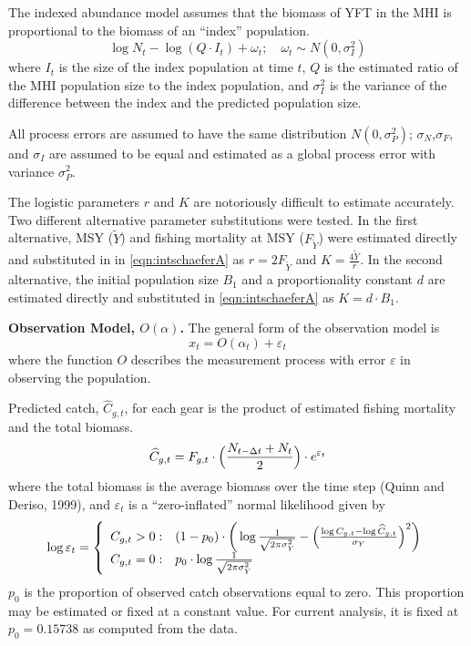 \documentclass[12pt,letterpaper,twoside]{article}
\newcommand\MSY{\tilde{Y}}
\newcommand\Fmsy{F_{\MSY}}
\begin{document}
The indexed abundance model
assumes that the biomass of YFT in the MHI
is proportional to the biomass of an ``index'' population.
\begin{equation}
\log N_t - \log (Q\cdot I_t) + \omega_t;\quad \omega_t\sim N(0,\sigma^2_I)
\label{eqn:index}
\end{equation}
where
$I_t$ is the size of the index population at time $t$,
$Q$ is the estimated ratio of the MHI population size to the index
population,
and $\sigma^2_I$ is the variance of the difference between the
index and the predicted population size.

All process errors are assumed to have the same distribution
$N(0,\sigma^2_P)$; $\sigma_N$,$\sigma_F$, and $\sigma_I$ are assumed
to be equal and estimated as a global process error with variance
$\sigma^2_P$.

The logistic parameters $r$ and $K$ are notoriously difficult to estimate
accurately. Two different
alternative parameter substitutions were tested. In the first
alternative, MSY ($\MSY$) and fishing mortality at MSY ($\Fmsy$) were
estimated directly and substituted in in \ref{eqn:intschaeferA} as
$r=2F_{\MSY}$ and $K=\frac{4\MSY}{r}$.
In the second alternative, the initial population size $B_1$ and a
proportionality constant $d$ are estimated directly and substituted in
\ref{eqn:intschaeferA} as $K=d\cdot B_1$.


{\bf Observation Model, $O(\alpha)$.}
The general form of the observation model is
\begin{equation}
x_t = O(\alpha_t) + \varepsilon_t
\end{equation}
where the function $O$ describes the measurement process with
error $\varepsilon$ in observing the population.

Predicted catch, $\widehat{C}_{g,t}$, for each gear is the product of
estimated fishing mortality and the total biomass.
\begin{equation}
\widehat{C}_{g,t} = F_{g,t}\cdot\Bigl(\frac{N_{t-\Delta
t}+N_t}{2}\Bigr) \cdot e^{\varepsilon_t}
\label{eqn:obs1}
\end{equation}
where the total biomass is  the average
biomass over the time step (Quinn and Deriso, 1999), and
$\varepsilon_t$ is a ``zero-inflated'' normal likelihood given by
\begin{equation}
  \log \varepsilon_t = \left\{
    \begin{array}{r@{\;:\quad}l}
       C_{g,t} > 0 &
(1-p_0)\cdot\bigg(\log\frac{1}{\sqrt{2\pi\sigma^2_Y}}
          -\Bigl(\frac{\log
C_{g,t}-\log\widehat{C}_{g,t}}{\sigma_Y}\Bigr)^2\bigg)\\
       C_{g,t} = 0 & p_0 \cdot\log \frac{1}{\sqrt{2\pi\sigma^2_Y}}\\
    \end{array}
  \right.
\end{equation}
$p_0$ is the proportion of observed catch observations equal to zero.
This proportion may be estimated or fixed at a constant value. For
current analysis, it is fixed at $p_0 = 0.15738$ as computed from the data.
\end{document}
